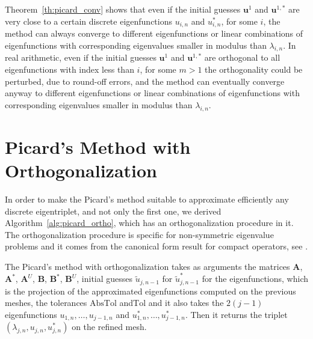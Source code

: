\documentclass[smallextended]{svjour3}
\begin{document}
Theorem~\ref{th:picard_conv} shows that even if the initial guesses $\mathbf{u}^1$ and $\mathbf{u}^{1,*}$ are very close to a certain discrete eigenfunctions $u_{i,n}$ and $u_{i,n}^*$, for some $i$, the method can always converge to different eigenfunctions or linear combinations of eigenfunctions with corresponding eigenvalues smaller in modulus than $\lambda_{i,n}$. In real arithmetic, even if the initial guesses $\mathbf{u}^1$ and $\mathbf{u}^{1,*}$ are orthogonal to all eigenfunctions with index less than $i$, for some $m>1$ the orthogonality could be perturbed, due to round-off errors, and the method can eventually converge anyway to different eigenfunctions or linear combinations of eigenfunctions with corresponding eigenvalues smaller in modulus than $\lambda_{i,n}$.





\section{Picard's Method with Orthogonalization}\label{sec:picard++}

In order to make the Picard's method suitable to approximate efficiently any discrete eigentriplet, and not only the first one, we derived Algorithm~\ref{alg:picard_ortho}, which has an orthogonalization procedure in it. The orthogonalization procedure is specific for non-symmetric eigenvalue problems and it comes from the canonical form result for compact operators, see \cite[Theorem~9.17]{Hislop}.

The Picard's method with orthogonalization takes as arguments the matrices $\mathbf{A}$, $\mathbf{A}^*$, $\mathbf{A}^U$, $\mathbf{B}$, $\mathbf{B}^*$, $\mathbf{B}^U$,  initial guesses $\tilde u_{j,n-1}$ for $\tilde u_{j,n-1}^*$ for the eigenfunctions, which is the projection of the approximated eigenfunctions computed on the previous meshes, the tolerances  $\mathrm{AbsTol}$ and$\mathrm{Tol}$ and it also takes the $2(j-1)$ eigenfunctions $u_{1,n},\dots,u_{j-1,n}$ and  $u_{1,n}^*,\dots,u_{j-1,n}^*$.
Then it returns the triplet $(\lambda_{j,n},u_{j,n},u_{j,n}^*)$ on the refined mesh.
\end{document}
